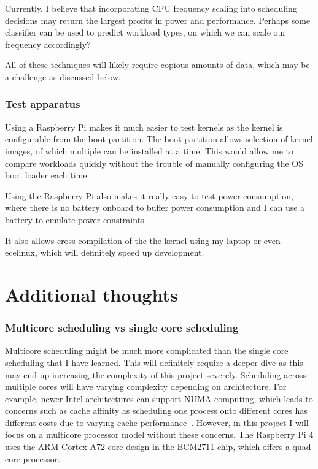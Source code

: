 \documentclass[12pt]{article}
\def\ind{\hspace*{0.3in}}
\begin{document}
Currently, I believe that incorporating CPU frequency scaling into scheduling decisions may return the largest profits in power and performance. Perhaps some classifier can be used to predict workload types, on which we can scale our frequency accordingly?

All of these techniques will likely require copious amounts of data, which may be a challenge as discussed below.

\subsubsection*{Test apparatus}

\ind Using a Raspberry Pi makes it much easier to test kernels as the kernel is configurable from the boot partition. The boot partition allows selection of kernel images, of which multiple can be installed at a time. This would allow me to compare workloads quickly without the trouble of manually configuring the OS boot loader each time.

Using the Raspberry Pi also makes it really easy to test power consumption, where there is no battery onboard to buffer power consumption and I can use a battery to emulate power constraints.

It also allows cross-compilation of the the kernel using my laptop or even ecelinux, which will definitely speed up development. 

\section*{Additional thoughts}

\subsubsection*{Multicore scheduling vs single core scheduling}
\ind Multicore scheduling might be much more complicated than the single core scheduling that I have learned. This will definitely require a deeper dive as this may end up increasing the complexity of this project severely. Scheduling across multiple cores will have varying complexity depending on architecture. For example, newer Intel architectures can support NUMA computing, which leads to concerns such as cache affinity as scheduling one process onto different cores has different costs due to varying cache performance~\cite{CpuschedmultiPdf}. However, in this project I will focus on a multicore processor model without these concerns. The Raspberry Pi 4 uses the ARM Cortex A72 core design in the BCM2711 chip, which offers a quad core processor.
\end{document}
